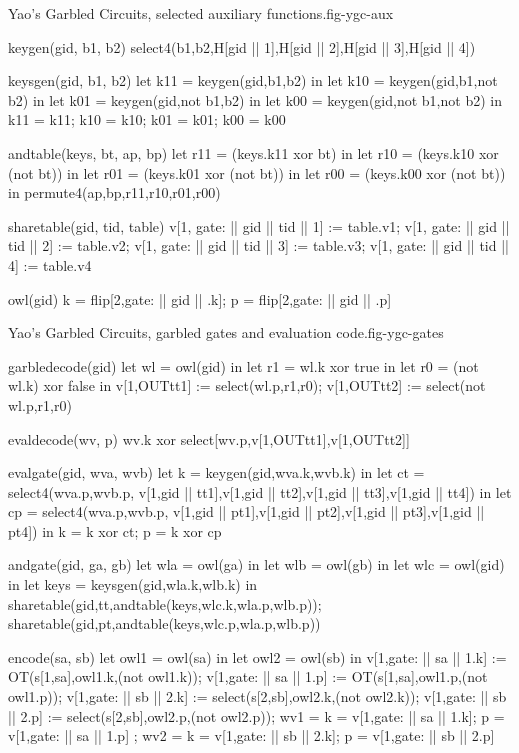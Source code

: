 \begin{fpfig}[t]{Yao's Garbled Circuits, selected auxiliary functions.}{fig-ygc-aux}
{\footnotesize
\begin{verbatimtab}
  keygen(gid, b1, b2) { select4(b1,b2,H[gid || 1],H[gid || 2],H[gid || 3],H[gid || 4]) }
  
  keysgen(gid, b1, b2)
  {
    let k11 = keygen(gid,b1,b2) in
    let k10 = keygen(gid,b1,not b2) in
    let k01 = keygen(gid,not b1,b2) in
    let k00 = keygen(gid,not b1,not b2) in
    {k11 = k11; k10 = k10; k01 = k01; k00 = k00}
  }
  
  andtable(keys, bt, ap, bp)
  {
    let r11 = (keys.k11 xor bt) in 
    let r10 = (keys.k10 xor (not bt)) in
    let r01 = (keys.k01 xor (not bt)) in
    let r00 = (keys.k00 xor (not bt)) in
    permute4(ap,bp,r11,r10,r01,r00)
  }
  
  sharetable(gid, tid, table)
  {   
    v[1, gate: || gid || tid || 1] := table.v1;
    v[1, gate: || gid || tid || 2] := table.v2;
    v[1, gate: || gid || tid || 3] := table.v3;
    v[1, gate: || gid || tid || 4] := table.v4
  }

  owl(gid) {  { k = flip[2,gate: || gid || .k]; p = flip[2,gate: || gid || .p] }  }
\end{verbatimtab}
}
\end{fpfig}

\begin{fpfig}[t]{Yao's Garbled Circuits, garbled gates and evaluation code.}{fig-ygc-gates}
{\footnotesize
\begin{verbatimtab}
  garbledecode(gid)    
  {
    let wl = owl(gid) in
    let r1 = wl.k xor true in
    let r0 = (not wl.k) xor false in
    v[1,OUTtt1] := select(wl.p,r1,r0);
    v[1,OUTtt2] := select(not wl.p,r1,r0)
  }
  
  evaldecode(wv, p) { wv.k xor select[wv.p,v[1,OUTtt1],v[1,OUTtt2]] }
  
  evalgate(gid, wva, wvb)  
  {
    let k = keygen(gid,wva.k,wvb.k) in
    let ct = select4(wva.p,wvb.p,
               v[1,gid || tt1],v[1,gid || tt2],v[1,gid || tt3],v[1,gid || tt4]) in
    let cp = select4(wva.p,wvb.p,
               v[1,gid || pt1],v[1,gid || pt2],v[1,gid || pt3],v[1,gid || pt4]) in
    { k = k xor ct; p = k xor cp }
  }
  
  andgate(gid, ga, gb) 
  {
    let wla = owl(ga) in
    let wlb = owl(gb) in
    let wlc = owl(gid) in
    let keys = keysgen(gid,wla.k,wlb.k) in
    sharetable(gid,tt,andtable(keys,wlc.k,wla.p,wlb.p));
    sharetable(gid,pt,andtable(keys,wlc.p,wla.p,wlb.p))
  }

  encode(sa, sb)
  {
    let owl1 = owl(sa) in
    let owl2 = owl(sb) in
    v[1,gate: || sa || 1.k] := OT(s[1,sa],owl1.k,(not owl1.k));
    v[1,gate: || sa || 1.p] := OT(s[1,sa],owl1.p,(not owl1.p));
    v[1,gate: || sb || 2.k] := select(s[2,sb],owl2.k,(not owl2.k));
    v[1,gate: || sb || 2.p] := select(s[2,sb],owl2.p,(not owl2.p));
    { wv1 = { k = v[1,gate: || sa || 1.k]; p = v[1,gate: || sa || 1.p] };
      wv2 = { k = v[1,gate: || sb || 2.k]; p = v[1,gate: || sb || 2.p] } }
  }
\end{verbatimtab}
}
\end{fpfig}

